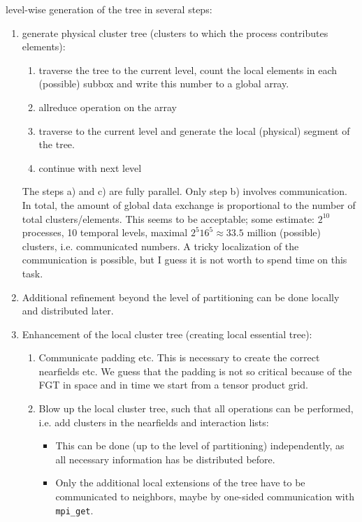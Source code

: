 \documentclass[a4paper]{scrartcl}
\begin{document}
level-wise generation of the tree in several steps:
\begin{enumerate}
  \item generate physical cluster tree (clusters to which the process
    contributes elements):
    \begin{enumerate}
      \item traverse the tree to the current level, count the local elements in
        each (possible) subbox and write this number to a global array.
      \item allreduce operation on the array
      \item traverse to the current level and generate the local (physical)
        segment of the tree.
      \item continue with next level
    \end{enumerate}
    The steps a) and c) are fully parallel. Only step b) involves communication. In
    total, the amount of global data exchange is proportional to the number of total
    clusters/elements. This seems to be acceptable; some estimate:
    $2^{10}$ processes, 10 temporal levels, maximal $2^5 16^5 \approx 33.5$
    million (possible) clusters, i.e. communicated numbers.
    A tricky localization of the communication is possible, but I guess it is not
    worth to spend  time on this task.
  \item Additional refinement beyond the level of partitioning can be done
      locally and distributed later. 
\item Enhancement of the local cluster tree (creating local essential tree):
  \begin{enumerate}
  \item Communicate padding etc. This is necessary to create the correct
    nearfields etc. We guess that the padding is not so critical
    because of the FGT in space and in time we start from a tensor product grid.
  \item Blow up the local cluster tree, such that all operations can be
    performed, i.e. add clusters in the nearfields and interaction lists:
    \begin{itemize}
    \item This can be done (up to the level of partitioning) independently, as all necessary information has be
    distributed before.
    \item Only the additional local extensions of the tree have to be
      communicated to neighbors, maybe by one-sided communication with \texttt{mpi\_get}. 
    \end{itemize}
  \end{enumerate}
\end{enumerate}
\end{document}
